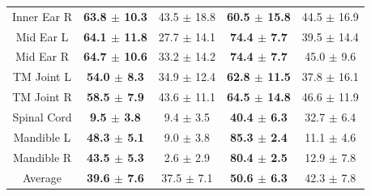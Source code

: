 \begin{table}[!h]
{\begin{tabular}{c|cc|cc}
Inner Ear R & \textbf{63.8 $\pm$ 10.3} & 43.5 $\pm$ 18.8 & \textbf{60.5 $\pm$ 15.8} & 44.5 $\pm$ 16.9 \\
Mid Ear L & \textbf{64.1 $\pm$ 11.8} & 27.7 $\pm$ 14.1 & \textbf{74.4 $\pm$ 7.7} & 39.5 $\pm$ 14.4 \\
Mid Ear R & \textbf{64.7 $\pm$ 10.6} & 33.2 $\pm$ 14.2 & \textbf{74.4 $\pm$ 7.7} & 45.0 $\pm$ 9.6 \\
TM Joint L & \textbf{54.0 $\pm$ 8.3} & 34.9 $\pm$ 12.4 & \textbf{62.8 $\pm$ 11.5} & 37.8 $\pm$ 16.1 \\
TM Joint R & \textbf{58.5 $\pm$ 7.9} & 43.6 $\pm$ 11.1 & \textbf{64.5 $\pm$ 14.8} & 46.6 $\pm$ 11.9 \\
Spinal Cord & \textbf{9.5 $\pm$ 3.8} & 9.4 $\pm$ 3.5 & \textbf{40.4 $\pm$ 6.3} & 32.7 $\pm$ 6.4 \\
Mandible L & \textbf{48.3 $\pm$ 5.1} & 9.0 $\pm$ 3.8 & \textbf{85.3 $\pm$ 2.4} & 11.1 $\pm$ 4.6 \\
Mandible R & \textbf{43.5 $\pm$ 5.3} & 2.6 $\pm$ 2.9 & \textbf{80.4 $\pm$ 2.5} & 12.9 $\pm$ 7.8 \\
\hline
Average          & \textbf{39.6 $\pm$ 7.6} & 37.5 $\pm$ 7.1 & \textbf{50.6 $\pm$ 6.3} & 42.3 $\pm$ 7.8\\ 
\hline
\end{tabular}}
\label{tab:structseg}
\end{table}